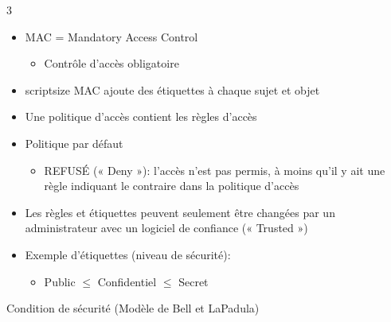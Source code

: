 \documentclass[9pt, a4paper, twoside]{article}
\begin{document}
\begin{multicols}{3}
\begin{itemize}[label=$\bullet$]
    \item \scriptsize MAC = Mandatory Access Control
    \begin{itemize}[label=$\circ$]
        \item \scriptsize Contrôle d'accès obligatoire
    \end{itemize}
    \item scriptsize MAC ajoute des étiquettes à chaque sujet et objet
    \item \scriptsize Une politique d'accès contient les règles d'accès
    \item \scriptsize Politique par défaut
    \begin{itemize}[label=$\circ$]
        \item \scriptsize REFUSÉ (« Deny »): l'accès n'est pas permis, à moins qu'il y ait une règle indiquant le contraire dans la politique d'accès
    \end{itemize}
    \item \scriptsize Les règles et étiquettes peuvent seulement être changées par un administrateur avec un logiciel de confiance (« Trusted »)
    \item \scriptsize Exemple d'étiquettes (niveau de sécurité):
    \begin{itemize}[label={}]
        \item \scriptsize Public $\le$ Confidentiel $\le$ Secret
    \end{itemize}
\end{itemize}

\begin{flushleft}
    \scriptsize  Condition de sécurité (Modèle de Bell et LaPadula)
\end{flushleft}


\end{multicols}
\end{document}
